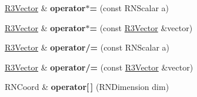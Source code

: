 \begin{DoxyCompactItemize}
\item 
\hyperlink{class_r3_vector}{R3\+Vector} \& {\bfseries operator$\ast$=} (const R\+N\+Scalar a)\hypertarget{class_r3_vector_a8532dc0bd36151e308937182dfd09396}{}\label{class_r3_vector_a8532dc0bd36151e308937182dfd09396}

\item 
\hyperlink{class_r3_vector}{R3\+Vector} \& {\bfseries operator$\ast$=} (const \hyperlink{class_r3_vector}{R3\+Vector} \&vector)\hypertarget{class_r3_vector_ac4a2224828bbcfa103c754706fdaa0b4}{}\label{class_r3_vector_ac4a2224828bbcfa103c754706fdaa0b4}

\item 
\hyperlink{class_r3_vector}{R3\+Vector} \& {\bfseries operator/=} (const R\+N\+Scalar a)\hypertarget{class_r3_vector_a29aa03223038a3f22050d1f3a59f1cf5}{}\label{class_r3_vector_a29aa03223038a3f22050d1f3a59f1cf5}

\item 
\hyperlink{class_r3_vector}{R3\+Vector} \& {\bfseries operator/=} (const \hyperlink{class_r3_vector}{R3\+Vector} \&vector)\hypertarget{class_r3_vector_ac693faebe05fb1ce636865616fb80fee}{}\label{class_r3_vector_ac693faebe05fb1ce636865616fb80fee}

\item 
R\+N\+Coord \& {\bfseries operator\mbox{[}$\,$\mbox{]}} (R\+N\+Dimension dim)\hypertarget{class_r3_vector_a21b2fc5b5bc4f6a6a74237e1e588268f}{}\label{class_r3_vector_a21b2fc5b5bc4f6a6a74237e1e588268f}

\end{DoxyCompactItemize}
